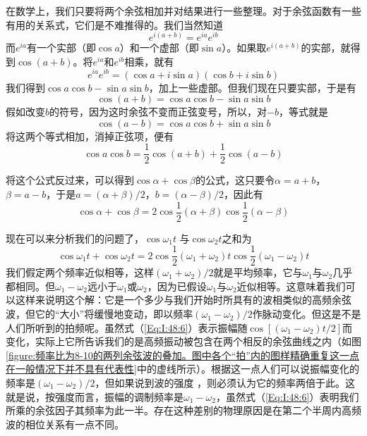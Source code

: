 在数学上，我们只要将两个余弦相加并对结果进行一些整理。对于余弦函数有一些有用的关系式，它们是不难推得的。我们当然知道
\begin{equation}
    \label{Eq:I:48:1}
    e^{i(a+b)} = e^{ia}e^{ib}
\end{equation}
而$e^{ia}$有一个实部（即$\cos a$）和一个虚部（即$\sin a$）。如果取$e^{i(a+b)}$的实部，就得到$\cos(a+b)$。将$e^{ia}$和$e^{ib}$相乘，就有
\begin{equation*}
    e^{ia}e^{ib} = (\cos a + i\sin a)(\cos b + i\sin b)
\end{equation*}
我们得到$\cos a \cos b -\sin a \sin b$，加上一些虚部。但我们现在只要实部，于是有
\begin{equation}
    \label{Eq:I:48:2}
    \cos(a+b) = \cos a \cos b - \sin a \sin b
\end{equation}
假如改变$b$的符号，因为这时余弦不变而正弦变号，所以，对$-b$，等式就是
\begin{equation}
    \label{Eq:I:48:3}
    \cos(a-b) = \cos a \cos b + \sin a \sin b
\end{equation}
将这两个等式相加，消掉正弦项，便有
\begin{equation}
    \label{Eq:I:48:4}
    \cos a \cos b = \frac{1}{2}\cos(a + b) + \frac{1}{2} \cos (a-b)
\end{equation}

将这个公式反过来，可以得到$\cos\alpha +\cos\beta$的公式，这只要令$\alpha =a +b$，$\beta=a-b$，于是$a =(\alpha+\beta)/2$，$b =(\alpha -\beta)/2$，因此有
\begin{equation}
    \label{Eq:I:48:5}
    \cos\alpha + \cos\beta = 2\cos\frac{1}{2}(\alpha + \beta)\cos\frac{1}{2}(\alpha - \beta)
\end{equation}

现在可以来分析我们的问题了，$\cos\omega_1 t$ 与$\cos\omega_2 t$之和为
\begin{equation}
    \label{Eq:I:48:6}
    \cos\omega_1t + \cos\omega_2t = 2\cos\frac{1}{2}(\omega_1 + \omega_2)t\cos\frac{1}{2}(\omega_1 - \omega_2)t
\end{equation}
我们假定两个频率近似相等，这样$(\omega_1 +\omega_2)/2$就是平均频率，它与$\omega_1$与$\omega_2$几乎都相同。但$\omega_1 -\omega_2$远小于$\omega_1$或$\omega_2$，因为已假设$\omega_1$与$\omega_2$近似相等。这意味着我们可以这样来说明这个解：它是一个多少与我们开始时所具有的波相类似的高频余弦波，但它的“大小”将缓慢地变动，即以频率$(\omega_1 -\omega_2)/2$作脉动变化。但这是不是人们所听到的拍频呢。虽然式（\ref{Eq:I:48:6}）表示振幅随$\cos[(\omega_1-\omega_2)t/2]$而变化，实际上它所告诉我们的是高频振动被包含在两个相反的余弦曲线之内（如图\ref{figure:频率比为8-10的两列余弦波的叠加。图中各个“拍”内的图样精确重复这一点在一般情况下并不具有代表性}中的虚线所示）。根据这一点人们可以说振幅变化的频率是$(\omega_1 -\omega_2)/2$，但如果说到波的强度 ，则必须认为它的频率两倍于此。这就是说，按强度而言，振幅的调制频率是$\omega_1 -\omega_2$，虽然式（\ref{Eq:I:48:6}）表明我们所乘的余弦因子其频率为此一半。存在这种差别的物理原因是在第二个半周内高频波的相位关系有一点不同。

